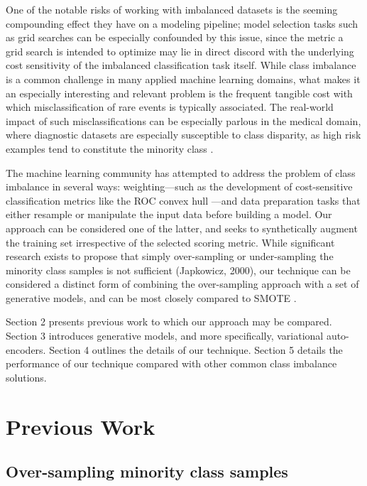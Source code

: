 \documentclass[twoside,11pt]{article}
\begin{document}
One of the notable risks of working with imbalanced datasets is the seeming compounding effect they have on a modeling pipeline; model selection tasks such as grid searches can be especially confounded by this issue, since the metric a grid search is intended to optimize may lie in direct discord with the underlying cost sensitivity of the imbalanced classification task itself. While class imbalance is a common challenge in many applied machine learning domains, what makes it an especially interesting and relevant problem is the frequent tangible cost with which misclassification of rare events is typically associated. The real-world impact of such misclassifications can be especially parlous in the medical domain, where diagnostic datasets are especially susceptible to class disparity, as high risk examples tend to constitute the minority class \citep{rahman2013addressing}.

The machine learning community has attempted to address the problem of class imbalance in several ways: weighting---such as the development of cost-sensitive classification metrics like the ROC convex hull \citep{provost2001robust}---and data preparation tasks that either resample or manipulate the input data before building a model. Our approach can be considered one of the latter, and seeks to synthetically augment the training set irrespective of the selected scoring metric. While significant research exists to propose that simply over-sampling or under-sampling the minority class samples is not sufficient (Japkowicz, 2000), our technique can be considered a distinct form of combining the over-sampling approach with a set of generative models, and can be most closely compared to SMOTE \citep{chawla2002smote}.

Section 2 presents previous work to which our approach may be compared. Section 3 introduces generative models, and more specifically, variational auto-encoders. Section 4 outlines the details of our technique. Section 5 details the performance of our technique compared with other common class imbalance solutions. \\

\section{Previous Work}
\subsection{Over-sampling minority class samples}
\end{document}
